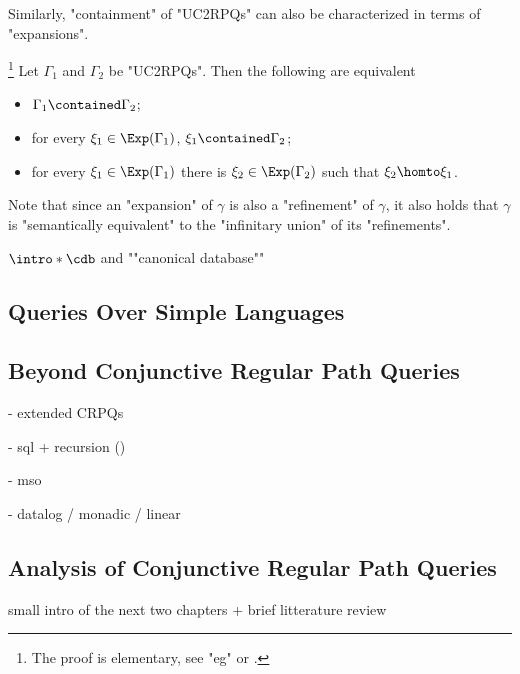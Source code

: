 Similarly, "containment" of "UC2RPQs" can also be characterized in terms of "expansions".
\begin{proposition}[Folklore]
    \AP\label{prop:cont-char-exp-st} 
    \!\footnote{The proof is elementary,
    see "eg" \cite[Proposition 3.2]{FlorescuLevySuciu1998Containment} 
    or \cite[Theorem 2]{CalvaneseDeGiacomoLenzeriniVardi2000Containment}.}
    Let $\Gamma_1$ and $\Gamma_2$ be "UC2RPQs". Then the following are equivalent
    \begin{itemize}
        \item $\Gamma_1 \contained \Gamma_2$;
        \item for every $\anexpansion_1\in \Exp(\Gamma_1)$, $\anexpansion_1 \contained \Gamma_2$;
        \item for every $\anexpansion_1\in \Exp(\Gamma_1)$ there is $\anexpansion_2\in \Exp(\Gamma_2)$ such that $\anexpansion_2\homto \anexpansion_1$. 
    \end{itemize}
\end{proposition}

Note that since an "expansion" of $\gamma$ is also a "refinement" of $\gamma$, it also
holds that $\gamma$ is "semantically equivalent" to the "infinitary union" of its "refinements".

 $\intro*\cdb$ and ""canonical database""


\subsection{Queries Over Simple Languages}


\subsection{Beyond Conjunctive Regular Path Queries}

- extended CRPQs

- sql + recursion ()

- mso

- datalog / monadic / linear

\subsection{Analysis of Conjunctive Regular Path Queries}

small intro of the next two chapters
+ brief litterature review


